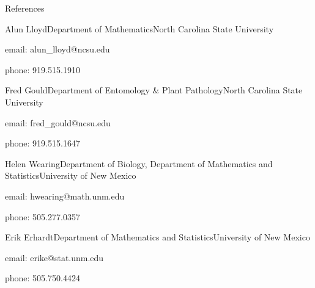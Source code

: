 \documentclass{resume} %
\begin{document}
\begin{rSection}{References}
\begin{rSubsection}{Alun Lloyd}{}{Department of Mathematics}{North Carolina State University}
\item email: alun\_lloyd@ncsu.edu
\item phone:  919.515.1910
\end{rSubsection}
\begin{rSubsection}{Fred Gould}{}{Department of Entomology \& Plant Pathology}{North Carolina State University}
\item email: fred\_gould@ncsu.edu
\item phone: 919.515.1647 
\end{rSubsection}
\begin{rSubsection}{Helen Wearing}{}{Department of Biology, Department of Mathematics and Statistics}{University of New Mexico}
\item email: hwearing@math.unm.edu
\item phone: 505.277.0357
\end{rSubsection}
\begin{rSubsection}{Erik Erhardt}{}{Department of Mathematics and Statistics}{University of New Mexico}
\item email: erike@stat.unm.edu
\item phone: 505.750.4424
\end{rSubsection}
\end{rSection}





\end{document}

